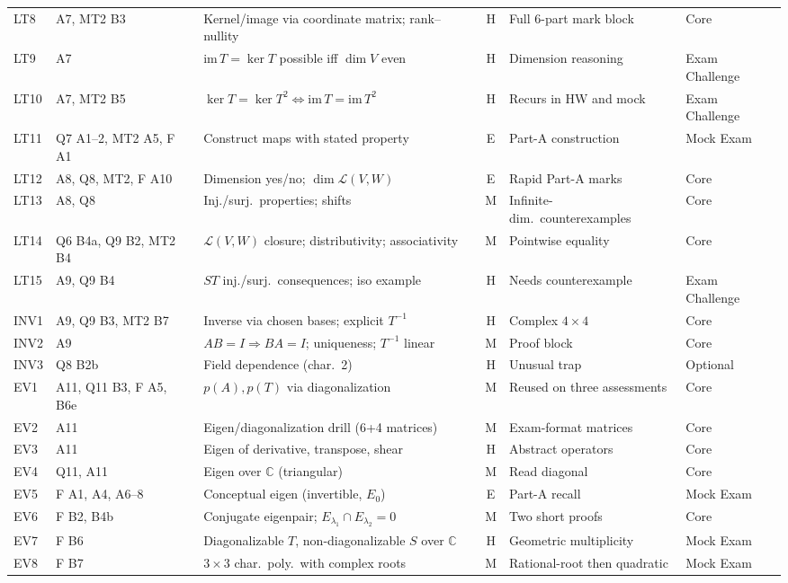 \documentclass[9pt]{article}
\begin{document}
{\begin{longtable}{@{}l p{2.6cm} p{5.2cm} c p{3.9cm} p{1.7cm}@{}}
LT8 & A7, MT2 B3 & Kernel/image via coordinate matrix; rank--nullity & H & Full 6-part mark block & Core\\
LT9 & A7 & $\mathrm{im}\,T=\ker T$ possible iff $\dim V$ even & H & Dimension reasoning & Exam Challenge\\
LT10 & A7, MT2 B5 & $\ker T=\ker T^2\iff\mathrm{im}\,T=\mathrm{im}\,T^2$ & H & Recurs in HW and mock & Exam Challenge\\
LT11 & Q7 A1--2, MT2 A5, F A1 & Construct maps with stated property & E & Part-A construction & Mock Exam\\
LT12 & A8, Q8, MT2, F A10 & Dimension yes/no; $\dim\mathcal L(V,W)$ & E & Rapid Part-A marks & Core\\
LT13 & A8, Q8 & Inj./surj.\ properties; shifts & M & Infinite-dim.\ counterexamples & Core\\
LT14 & Q6 B4a, Q9 B2, MT2 B4 & $\mathcal L(V,W)$ closure; distributivity; associativity & M & Pointwise equality & Core\\
LT15 & A9, Q9 B4 & $ST$ inj./surj.\ consequences; iso example & H & Needs counterexample & Exam Challenge\\
INV1 & A9, Q9 B3, MT2 B7 & Inverse via chosen bases; explicit $T^{-1}$ & H & Complex $4\times4$ & Core\\
INV2 & A9 & $AB=I\Rightarrow BA=I$; uniqueness; $T^{-1}$ linear & M & Proof block & Core\\
INV3 & Q8 B2b & Field dependence (char.\ 2) & H & Unusual trap & Optional\\
EV1 & A11, Q11 B3, F A5, B6e & $p(A),p(T)$ via diagonalization & M & Reused on three assessments & Core\\
EV2 & A11 & Eigen/diagonalization drill (6+4 matrices) & M & Exam-format matrices & Core\\
EV3 & A11 & Eigen of derivative, transpose, shear & H & Abstract operators & Core\\
EV4 & Q11, A11 & Eigen over $\mathbb C$ (triangular) & M & Read diagonal & Core\\
EV5 & F A1, A4, A6--8 & Conceptual eigen (invertible, $E_0$) & E & Part-A recall & Mock Exam\\
EV6 & F B2, B4b & Conjugate eigenpair; $E_{\lambda_1}\cap E_{\lambda_2}=0$ & M & Two short proofs & Core\\
EV7 & F B6 & Diagonalizable $T$, non-diagonalizable $S$ over $\mathbb C$ & H & Geometric multiplicity & Mock Exam\\
EV8 & F B7 & $3\times3$ char.\ poly.\ with complex roots & M & Rational-root then quadratic & Mock Exam\\

\end{longtable}}
\end{document}
